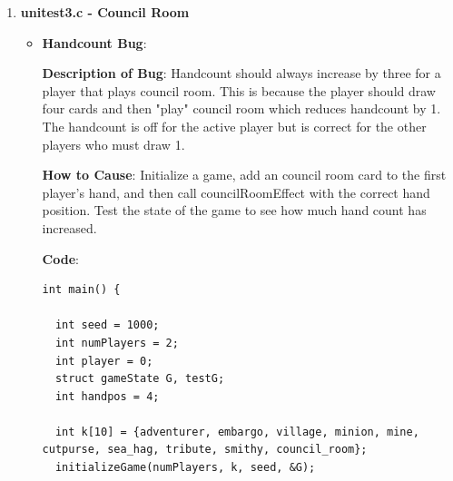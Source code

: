 \documentclass[11pt,letterpaper]{article}
\begin{document}
\begin{enumerate}[label=\Roman*.]
\begin{enumerate}
\begin{itemize}[leftmargin=*]
          \begin{lstlisting}

int main() {
  
  int pass;                             
  int seed = 1000;                      
  int numPlayers = 4;                   
  int player = 0;                      
  struct gameState G, testG;  
  int handpos = 4;                   

  // initialize a game state and player cards
  int k[10] = {adventurer, embargo, village, minion, mine, cutpurse, sea_hag, tribute, smithy, council_room};
  initializeGame(numPlayers, k, seed, &G);
  memcpy(&testG, &G, sizeof(struct gameState));
  smithyEffect(&testG, player, handpos);       

  if (G->numBuys != testG->numBuys) {
    printf("\t\u274CFAILED: Gamestate numBuys has changed\n");
    total_pass = 0;
  }
}
          \end{lstlisting}
        \end{itemize}

      \item \textbf{unitest3.c - Council Room}

        \begin{itemize}[leftmargin=*]

        \item \textbf{Handcount Bug}:

        \textbf{Description of Bug}: Handcount should always increase by three 
            for a player that plays council room. This is because the player should 
            draw four cards and then "play" council room which reduces handcount by 1.
            The handcount is off for the active player but is correct for the other players
            who must draw 1.

        \textbf{How to Cause}: Initialize a game, add an council room card to 
          the first player's hand, and then call councilRoomEffect with the correct
          hand position. Test the state of the game to see how much hand count has increased.

        \textbf{Code}:

          \begin{lstlisting}
int main() {
  
  int seed = 1000;                      
  int numPlayers = 2;                   
  int player = 0;                       
  struct gameState G, testG;
  int handpos = 4;                      

  int k[10] = {adventurer, embargo, village, minion, mine, cutpurse, sea_hag, tribute, smithy, council_room};
  initializeGame(numPlayers, k, seed, &G);


\end{lstlisting}
\end{itemize}
\end{enumerate}
\end{enumerate}
\end{document}
